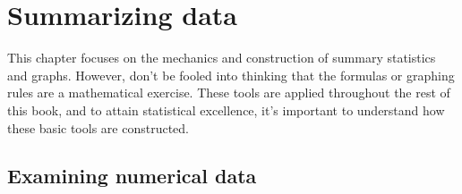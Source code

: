 \chapter{Summarizing data}
\label{summarizingData}
\label{ch_summarizing_data}
\renewcommand{\chapterfolder}{ch_summarizing_data}



This chapter focuses on the mechanics and construction
of summary statistics and graphs.
However, don't be fooled into thinking that the formulas
or graphing rules are a mathematical exercise.
These tools are applied throughout the rest of this book,
and to attain statistical excellence,
it's important to understand how these basic tools
are constructed.


\section[Examining numerical data]{Examining numerical data ~}
\label{numericalData}

\newcommand{\loanA}{10.90}
\newcommand{\loanB}{9.92}
\newcommand{\loanC}{26.30}
\newcommand{\loanD}{9.92}
\newcommand{\loanY}{9.43}
\newcommand{\loanZ}{6.08}
\newcommand{\loanAvg}{11.57}
\newcommand{\loanVar}{25.52}
\newcommand{\loanSD}{5.05}
\newcommand{\loanN}{50}
\newcommand{\loanMedianBelow}{9.93}
\newcommand{\loanMedianAbove}{9.93}
\newcommand{\loanMedian}{9.93}
\newcommand{\loanQA}{7.96}
\newcommand{\loanQC}{13.72}
\newcommand{\loanIQR}{5.76}
\newcommand{\loanAdev}{-0.67}
\newcommand{\loanBdev}{-1.65}
\newcommand{\loanCdev}{14.73}
\newcommand{\loanDdev}{-1.65}
\newcommand{\loanYdev}{-2.14}
\newcommand{\loanZdev}{-5.49}
\newcommand{\loanSmallestValue}{5.31}
\newcommand{\loanLargestValue}{26.30}




